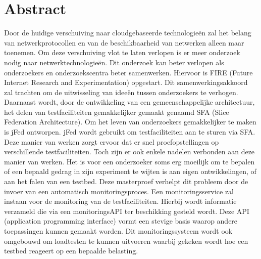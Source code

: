 \newpage
\chapter*{Abstract}
\npar
Door de huidige verschuiving naar cloudgebaseerde technologie\"en zal het belang 
van netwerkprotocollen en van de beschikbaarheid van netwerken alleen maar toenemen.
Om deze verschuiving vlot te laten verlopen is er meer onderzoek nodig naar netwerktechnologie\"en. Dit onderzoek kan beter verlopen als onderzoekers en onderzoekscentra beter samenwerken. Hiervoor is FIRE (Future Internet Research and Experimentation) opgestart. Dit samenwerkingsakkoord zal trachten om de uitwisseling van ideeën tussen onderzoekers te verhogen.
\npar
Daarnaast wordt, door de ontwikkeling van een gemeenschappelijke architectuur,  het delen van testfaciliteiten gemakkelijker gemaakt genaamd SFA (Slice Federation Architecture). Om het leven van onderzoekers gemakkelijker te maken is jFed ontworpen. jFed wordt gebruikt om testfaciliteiten aan te sturen via SFA. Deze manier van werken zorgt ervoor dat er snel proefopstellingen op verschillende testfaciliteiten. Toch zijn er ook enkele nadelen verbonden aan deze manier van werken. Het is voor een onderzoeker soms erg moeilijk om te bepalen of een bepaald gedrag in zijn experiment te wijten is aan eigen ontwikkelingen, of aan het falen van een testbed.
\npar
Deze masterproef verhelpt dit probleem door de invoer van een automatisch monitoringsproces. Een monitoringsservice zal instaan voor de monitoring van de testfaciliteiten. Hierbij wordt informatie verzameld die via een monitoringsAPI ter beschikking gesteld wordt. Deze API (application programming interface) vormt een stevige basis waarop andere toepassingen kunnen gemaakt worden.
\npar
Dit monitoringssysteem wordt ook omgebouwd om loadtesten te kunnen uitvoeren waarbij gekeken wordt hoe een testbed reageert op een bepaalde belasting.